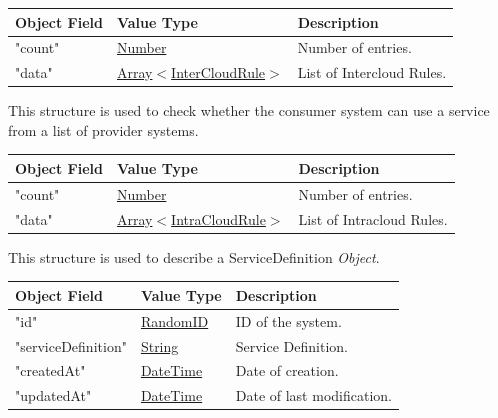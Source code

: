 \documentclass[a4paper]{arrowhead}
\newcommand{\mref}[1]{{\textcolor{ArrowheadPurple}{\hyperref[sec:model:#1]{#1}}}}
\newcommand{\pref}[1]{{\textcolor{ArrowheadGrey}{\hyperref[sec:model:primitives:#1]{#1}}}}
\begin{document}
\begin{table}[ht!]
\begin{tabularx}{\textwidth}{| p{5cm} | p{5cm} | X |} \hline
\rowcolor{gray!33} Object Field & Value Type      & Description \\ \hline
"count"                   & \pref{Number}     & Number of entries. \\ \hline
"data"  & \pref{Array}$<$\mref{InterCloudRule}$>$     & List of Intercloud Rules. \\ \hline

\end{tabularx}
\end{table}


This structure is used to check whether the consumer system can use a service from a list of provider systems.

\begin{table}[ht!]
\begin{tabularx}{\textwidth}{| p{5cm} | p{5cm} | X |} \hline
\rowcolor{gray!33} Object Field & Value Type      & Description \\ \hline
"count"                   & \pref{Number}     & Number of entries. \\ \hline
"data"  & \pref{Array}$<$\mref{IntraCloudRule}$>$     & List of Intracloud Rules. \\ \hline

\end{tabularx}
\end{table}


This structure is used to describe a ServiceDefinition \textit{Object}.

\begin{table}[ht!]
\begin{tabularx}{\textwidth}{| p{5cm} | p{3.5cm} | X |} \hline
\rowcolor{gray!33} Object Field & Value Type      & Description \\ \hline
"id"                  & \pref{RandomID}   & ID of the system. \\ \hline
"serviceDefinition"          & \pref{String}       & Service Definition. \\ \hline
"createdAt"           & \pref{DateTime}   & Date of creation. \\ \hline
"updatedAt"           & \pref{DateTime}   & Date of last modification. \\ \hline


\end{tabularx}
\end{table}
\end{document}
